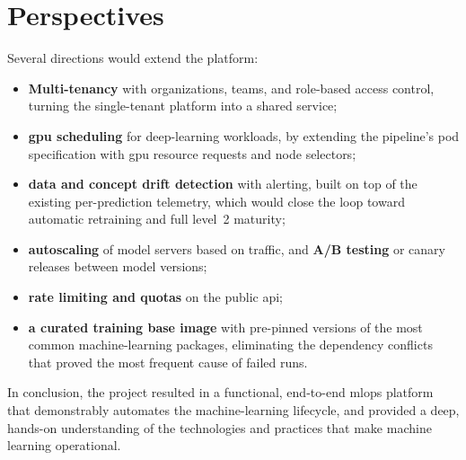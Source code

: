 \section*{Perspectives}
Several directions would extend the platform:
\begin{itemize}[leftmargin=1.4em]
  \item \textbf{Multi-tenancy} with organizations, teams, and role-based access
        control, turning the single-tenant platform into a shared service;
  \item \textbf{\gls{gpu} scheduling} for deep-learning workloads, by extending
        the pipeline's pod specification with \gls{gpu} resource requests and
        node selectors;
  \item \textbf{data and concept drift detection} with alerting, built on top of
        the existing per-prediction telemetry, which would close the loop toward
        automatic retraining and full level~2 maturity;
  \item \textbf{autoscaling} of model servers based on traffic, and
        \textbf{A/B testing} or canary releases between model versions;
  \item \textbf{rate limiting and quotas} on the public \gls{api};
  \item \textbf{a curated training base image} with pre-pinned versions of the
        most common machine-learning packages, eliminating the dependency
        conflicts that proved the most frequent cause of failed runs.
\end{itemize}

In conclusion, the project resulted in a functional, end-to-end \gls{mlops}
platform that demonstrably automates the machine-learning lifecycle, and provided a
deep, hands-on understanding of the technologies and practices that make machine
learning operational.
